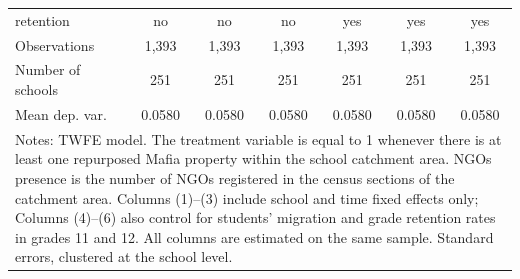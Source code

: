 \documentclass[12pt]{article}
\theoremstyle{plain}
\theoremstyle{plain}
\theoremstyle{plain}
\theoremstyle{definition}
\theoremstyle{plain}
\theoremstyle{definition}
\theoremstyle{plain}
\theoremstyle{remark}
\theoremstyle{definition}
\theoremstyle{definition}
\theoremstyle{plain}
\begin{document}
\begin{table}[H]
{\begin{tabular}{p{7.5em}llllll}
			\multicolumn{1}{l}{retention} & \multicolumn{1}{c}{no} & \multicolumn{1}{c}{no} & \multicolumn{1}{c}{no} & \multicolumn{1}{c}{yes} & \multicolumn{1}{c}{yes} & \multicolumn{1}{c}{yes} \\
			\multicolumn{1}{l}{Observations} & \multicolumn{1}{c}{1,393} & \multicolumn{1}{c}{1,393} & \multicolumn{1}{c}{1,393} & \multicolumn{1}{c}{1,393} & \multicolumn{1}{c}{1,393} & \multicolumn{1}{c}{1,393} \\
			\multicolumn{1}{l}{Number of schools} & \multicolumn{1}{c}{251} & \multicolumn{1}{c}{251} & \multicolumn{1}{c}{251} & \multicolumn{1}{c}{251} & \multicolumn{1}{c}{251} & \multicolumn{1}{c}{251} \\
			\multicolumn{1}{l}{Mean dep. var.} & \multicolumn{1}{c}{0.0580} & \multicolumn{1}{c}{0.0580} & \multicolumn{1}{c}{0.0580} & \multicolumn{1}{c}{0.0580} & \multicolumn{1}{c}{0.0580} & \multicolumn{1}{c}{0.0580} \\
			\midrule
			\multicolumn{7}{p{43.385em}}{Notes: TWFE model. The treatment variable is equal to 1 whenever there is at least one repurposed Mafia property within the school catchment area. NGOs presence is the number of NGOs registered in the census sections of the catchment area. Columns (1)--(3) include school and time fixed effects only; Columns (4)--(6) also control for students' migration and grade retention rates in grades 11 and 12. All columns are estimated on the same sample. Standard errors, clustered at the school level.} \\
		\end{tabular}%
	}
\end{table}
\end{document}
